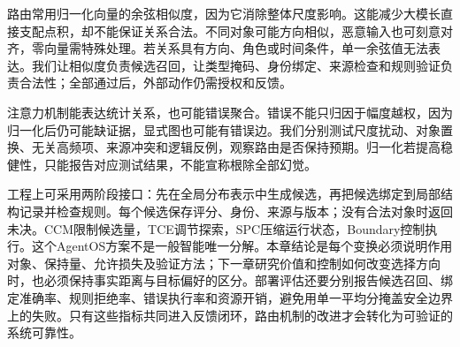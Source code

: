 路由常用归一化向量的余弦相似度，因为它消除整体尺度影响。这能减少大模长直接支配点积，却不能保证关系合法。不同对象可能方向相似，恶意输入也可刻意对齐，零向量需特殊处理。若关系具有方向、角色或时间条件，单一余弦值无法表达。我们让相似度负责候选召回，让类型掩码、身份绑定、来源检查和规则验证负责合法性；全部通过后，外部动作仍需授权和反馈。

注意力机制能表达统计关系，也可能错误聚合。错误不能只归因于幅度越权，因为归一化后仍可能缺证据，显式图也可能有错误边。我们分别测试尺度扰动、对象置换、无关高频项、来源冲突和逻辑反例，观察路由是否保持预期。归一化若提高稳健性，只能报告对应测试结果，不能宣称根除全部幻觉。

工程上可采用两阶段接口：先在全局分布表示中生成候选，再把候选绑定到局部结构记录并检查规则。每个候选保存评分、身份、来源与版本；没有合法对象时返回未决。CCM限制候选量，TCE调节探索，SPC压缩运行状态，Boundary控制执行。这个AgentOS方案不是一般智能唯一分解。本章结论是每个变换必须说明作用对象、保持量、允许损失及验证方法；下一章研究价值和控制如何改变选择方向时，也必须保持事实距离与目标偏好的区分。部署评估还要分别报告候选召回、绑定准确率、规则拒绝率、错误执行率和资源开销，避免用单一平均分掩盖安全边界上的失败。只有这些指标共同进入反馈闭环，路由机制的改进才会转化为可验证的系统可靠性。

